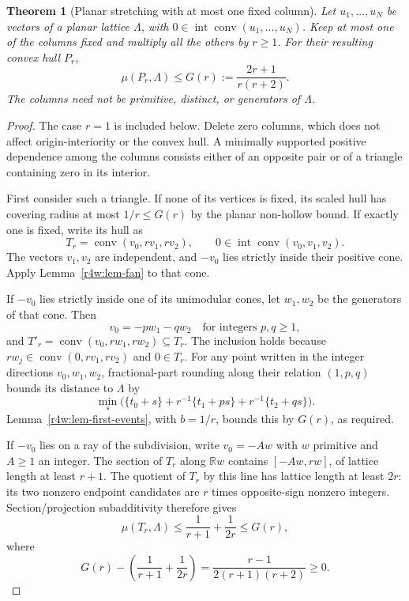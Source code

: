\documentclass[11pt,a4paper]{article}
\newtheorem{theorem}{Theorem}[section]
\theoremstyle{remark}\newtheorem{remark}[theorem]{Remark}
\begin{document}
\begin{theorem}[Planar stretching with at most one fixed column]
\label{r4w:thm-stretch}
Let $u_1,\ldots,u_N$ be vectors of a planar lattice $\Lambda$,
with $0\in\operatorname{int}\operatorname{conv}(u_1,\ldots,u_N)$.
Keep at most one of the columns fixed and multiply all the others
by $r\ge1$. For their resulting convex hull $P_r$,
\[
 \boxed{\displaystyle
 \mu(P_r,\Lambda)\le G(r):=\frac{2r+1}{r(r+2)}.}
\]
The columns need not be primitive, distinct, or generators of $\Lambda$.
\end{theorem}
\begin{proof}
The case $r=1$ is included below. Delete zero columns, which does not
affect origin-interiority or the convex hull. A minimally supported
positive dependence among the columns consists either of an opposite
pair or of a triangle containing zero in its interior.

First consider such a triangle. If none of its vertices is fixed,
its scaled hull has covering radius at most $1/r\le G(r)$ by the
planar non-hollow bound. If exactly one is fixed, write its hull as
\[
 T_r=\operatorname{conv}(v_0,rv_1,rv_2),
 \qquad 0\in\operatorname{int}\operatorname{conv}(v_0,v_1,v_2).
\]
The vectors $v_1,v_2$ are independent, and $-v_0$ lies strictly
inside their positive cone. Apply Lemma~\ref{r4w:lem-fan} to that cone.

If $-v_0$ lies strictly inside one of its unimodular cones, let
$w_1,w_2$ be the generators of that cone. Then
\[
 v_0=-pw_1-qw_2\quad\text{for integers }p,q\ge1,
\]
and
$T'_r=\operatorname{conv}(v_0,rw_1,rw_2)\subseteq T_r$.
The inclusion holds because $rw_j\in\operatorname{conv}(0,rv_1,rv_2)$
and $0\in T_r$. For any point written in the integer directions
$v_0,w_1,w_2$, fractional-part rounding along their relation
$(1,p,q)$ bounds its distance to $\Lambda$ by
\[
 \min_s\bigl(\{t_0+s\}+r^{-1}\{t_1+ps\}
                    +r^{-1}\{t_2+qs\}\bigr).
\]
Lemma~\ref{r4w:lem-first-events}, with $b=1/r$, bounds this by
$G(r)$, as required.

If $-v_0$ lies on a ray of the subdivision, write $v_0=-Aw$
with $w$ primitive and $A\ge1$ an integer. The section of $T_r$
along $\mathbb Rw$ contains $[-Aw,rw]$, of lattice length at
least $r+1$. The quotient of $T_r$ by this line has lattice
length at least $2r$: its two nonzero endpoint candidates are
$r$ times opposite-sign nonzero integers. Section/projection
subadditivity therefore gives
\[
 \mu(T_r,\Lambda)\le\frac1{r+1}+\frac1{2r}\le G(r),
\]
where
\[
 G(r)-\left(\frac1{r+1}+\frac1{2r}\right)
 =\frac{r-1}{2(r+1)(r+2)}\ge0.
\]


\end{proof}
\end{document}

